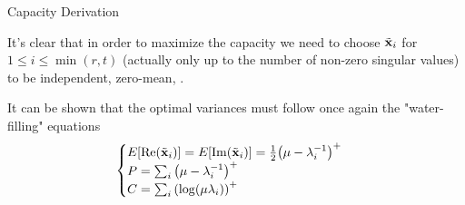 \begin{frame}[allowframebreaks]{Capacity Derivation}
\framebreak

It's clear that in order to maximize the capacity we need to choose $\tilde{\vb{\vb{x}}}_i$ for $1\leq i \leq \min(r,t)$ (actually only up to the number of non-zero singular values) to be independent, zero-mean, \cscg.

\medskip
It can be shown that the optimal variances must follow once again the "water-filling" equations
\begin{equation*}
\begin{cases}
E_{}\qty[\Re(\tilde{\vb{\vb{x}}}_i)] = E_{}\qty[\Im(\tilde{\vb{\vb{x}}}_i)] = \frac{1}{2} \qty(\mu-\lambda_i^{-1})^+\\
P = \sum_i \qty(\mu-\lambda_i^{-1})^+\\
C = \sum_i \qty(\log(\mu\lambda_i))^+
\end{cases}
\end{equation*}

\end{frame}

